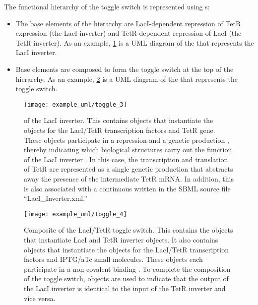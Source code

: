 The functional hierarchy of the toggle switch is represented using
s:
\begin{itemize}
\item The base elements of the hierarchy are LacI-dependent repression of TetR expression (the LacI inverter) and TetR-dependent repression of LacI (the TetR inverter). As an example, \ref{uml:ex_mod_def} is a UML diagram of the  that represents the LacI inverter.
\item Base elements are composed to form the toggle switch at the top of the hierarchy.  As an example, \ref{uml:ex_mod_def_compo} is a UML diagram of the  that represents the toggle switch.
\end{itemize}


\begin{figure}[ht]
\begin{center}
\texttt{[image: example\_uml/toggle\_3]}
\caption[]{ of the LacI inverter. This  contains  objects that instantiate the  objects for the LacI/TetR transcription factors and TetR gene. These  objects participate in a repression  and a genetic production , thereby indicating which biological structures carry out the function of the LacI inverter . In this case, the transcription and translation of TetR are represented as a single genetic production  that abstracts away the presence of the intermediate TetR mRNA.  In addition, this  is also associated with a continuous  written in the SBML source file ``LacI\_Inverter.xml.''}
\label{uml:ex_mod_def}
\end{center}
\end{figure}

\begin{figure}[ht]
\begin{center}
\texttt{[image: example\_uml/toggle\_4]}
\caption[]{Composite  of the LacI/TetR toggle switch. This  contains the  objects that instantiate LacI and TetR inverter  objects. It also contains  objects that instantiate the  objects for the LacI/TetR transcription factors and IPTG/aTc small molecules. These  objects each participate in a non-covalent binding . To complete the composition of the toggle switch,  objects are used to indicate that the output of the LacI inverter  is identical to the input of the TetR inverter  and vice versa.
}
\label{uml:ex_mod_def_compo}
\end{center}
\end{figure}


